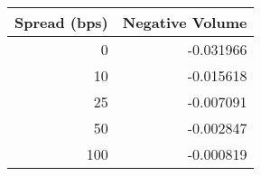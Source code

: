 \begin{tabular}{rr}
\toprule
 Spread (bps) &  Negative Volume \\
\midrule
            0 &        -0.031966 \\
           10 &        -0.015618 \\
           25 &        -0.007091 \\
           50 &        -0.002847 \\
          100 &        -0.000819 \\
\bottomrule
\end{tabular}
